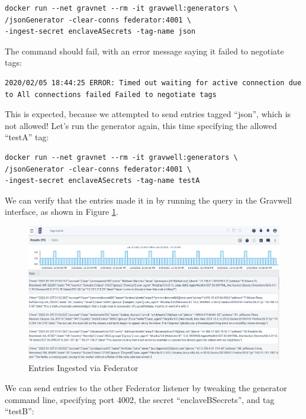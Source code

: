 \begin{Verbatim}[breaklines=true]
docker run --net gravnet --rm -it gravwell:generators \
/jsonGenerator -clear-conns federator:4001 \
-ingest-secret enclaveASecrets -tag-name json
\end{Verbatim}

The command should fail, with an error message saying it
failed to negotiate tags:

\begin{Verbatim}[breaklines=true]
2020/02/05 18:44:25 ERROR: Timed out waiting for active connection due to All connections failed Failed to negotiate tags
\end{Verbatim}

This is expected, because we attempted to send entries tagged ``json'', which is not allowed! Let's run the generator again, this time specifying the allowed ``testA'' tag:

\begin{Verbatim}[breaklines=true]
docker run --net gravnet --rm -it gravwell:generators \
/jsonGenerator -clear-conns federator:4001 \
-ingest-secret enclaveASecrets -tag-name testA
\end{Verbatim}

We can verify that the entries made it in by running the query  in the Gravwell interface, as shown in Figure \ref{fig:federator-lab-1}.

\begin{figure}[H]
	\includegraphics{images/igst-federator-lab.png}
	\caption{Entries Ingested via Federator}
	\label{fig:federator-lab-1}
\end{figure}

We can send entries to the other Federator listener by tweaking the generator command line, specifying port 4002, the secret ``enclaveBSecrets'', and tag ``testB'':

